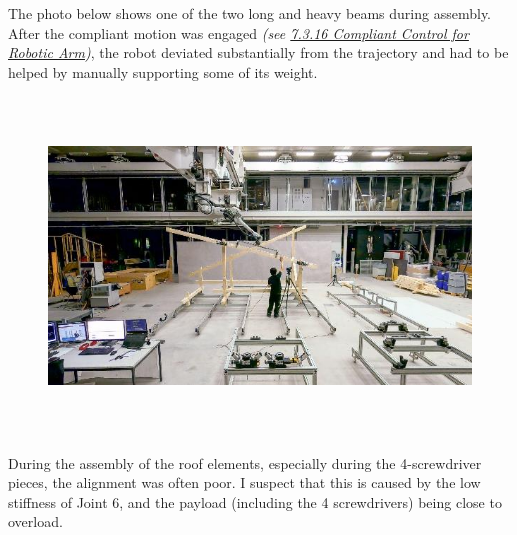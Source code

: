 \documentclass[11pt]{book}
\begin{document}
The photo below shows one of the two long and heavy beams during assembly. After the compliant motion was engaged \textit{(see \uline{7.3.16 Compliant Control for Robotic Arm})}, the robot deviated substantially from the trajectory and had to be helped by manually supporting some of its weight.

\begin{figure}[H]
\includegraphics[width=15.92cm,height=8.96cm]{./images/image98.jpeg}
\end{figure}


During the assembly of the roof elements, especially during the 4-screwdriver pieces, the alignment was often poor. I suspect that this is caused by the low stiffness of Joint 6, and the payload (including the 4 screwdrivers) being close to overload. 
\end{document}
